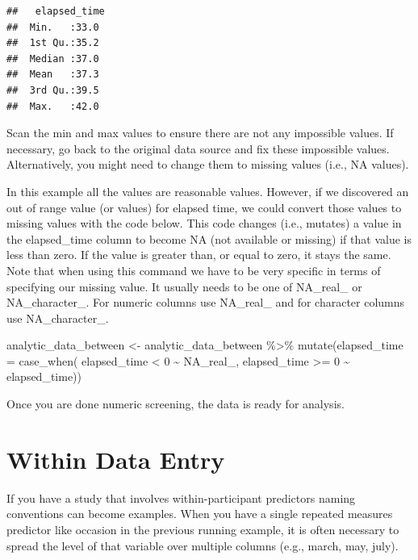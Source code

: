 \documentclass[
]{krantz}
\makeatletter
\newenvironment{Shaded}{\begin{snugshade}}{\end{snugshade}}
\newcommand{\AttributeTok}[1]{\textcolor[rgb]{0.61,0.61,0.61}{#1}}
\newcommand{\ConstantTok}[1]{\textcolor[rgb]{0,0,0}{#1}}
\newcommand{\DecValTok}[1]{\textcolor[rgb]{0.06,0.06,0.06}{#1}}
\newcommand{\FunctionTok}[1]{\textcolor[rgb]{0,0,0}{#1}}
\newcommand{\NormalTok}[1]{#1}
\newcommand{\OtherTok}[1]{\textcolor[rgb]{0.37,0.37,0.37}{#1}}
\newcommand{\SpecialCharTok}[1]{\textcolor[rgb]{0,0,0}{#1}}
\newenvironment{kframe}{%
\medskip{}
\setlength{\fboxsep}{.8em}
 \def\at@end@of@kframe{}%
 \ifinner\ifhmode%
  \def\at@end@of@kframe{\end{minipage}}%
  \begin{minipage}{\columnwidth}%
 \fi\fi%
 \def\FrameCommand##1{\hskip\@totalleftmargin \hskip-\fboxsep
 \colorbox{shadecolor}{##1}\hskip-\fboxsep
     \hskip-\linewidth \hskip-\@totalleftmargin \hskip\columnwidth}%
 \MakeFramed {\advance\hsize-\width
   \@totalleftmargin\z@ \linewidth\hsize
   \@setminipage}}%
 {\par\unskip\endMakeFramed%
 \at@end@of@kframe}
\renewenvironment{Shaded}{\begin{kframe}}{\end{kframe}}
\makeatother
\begin{document}
\begin{verbatim}
##   elapsed_time 
##  Min.   :33.0  
##  1st Qu.:35.2  
##  Median :37.0  
##  Mean   :37.3  
##  3rd Qu.:39.5  
##  Max.   :42.0
\end{verbatim}

Scan the min and max values to ensure there are not any impossible values. If necessary, go back to the original data source and fix these impossible values. Alternatively, you might need to change them to missing values (i.e., NA values).

In this example all the values are reasonable values. However, if we discovered an out of range value (or values) for elapsed time, we could convert those values to missing values with the code below. This code changes (i.e., mutates) a value in the elapsed\_time column to become NA (not available or missing) if that value is less than zero. If the value is greater than, or equal to zero, it stays the same. Note that when using this command we have to be very specific in terms of specifying our missing value. It usually needs to be one of NA\_real\_ or NA\_character\_. For numeric columns use NA\_real\_ and for character columns use NA\_character\_.

\begin{Shaded}
\begin{Highlighting}[]
\NormalTok{analytic\_data\_between }\OtherTok{\textless{}{-}}\NormalTok{ analytic\_data\_between  }\SpecialCharTok{\%\textgreater{}\%} 
    \FunctionTok{mutate}\NormalTok{(}\AttributeTok{elapsed\_time =} \FunctionTok{case\_when}\NormalTok{(}
\NormalTok{      elapsed\_time }\SpecialCharTok{\textless{}} \DecValTok{0} \SpecialCharTok{\textasciitilde{}} \ConstantTok{NA\_real\_}\NormalTok{,}
\NormalTok{      elapsed\_time }\SpecialCharTok{\textgreater{}=} \DecValTok{0} \SpecialCharTok{\textasciitilde{}}\NormalTok{ elapsed\_time))}
\end{Highlighting}
\end{Shaded}

Once you are done numeric screening, the data is ready for analysis.

\hypertarget{within-data-entry}{%
\section{Within Data Entry}\label{within-data-entry}}

If you have a study that involves within-participant predictors naming conventions can become examples. When you have a single repeated measures predictor like occasion in the previous running example, it is often necessary to spread the level of that variable over multiple columns (e.g., march, may, july).
\end{document}
